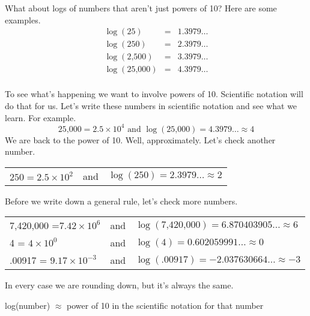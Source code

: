 What about logs of numbers that aren't just powers of 10? Here are some examples.
\begin{eqnarray*}
\log (25) & = & 1.3979\ldots \\
\log (250) & = & 2.3979\ldots \\
\log (\text{2,500}) & = & 3.3979\ldots \\
\log (\text{25,000}) & = & 4.3979\ldots \\
\end{eqnarray*}
\vspace{-.5in} %

To see what's happening we want to involve powers of 10.  Scientific notation will do that for us.  Let's write these numbers in scientific notation and see what we learn.  For example.
$$ \text{25,000} = 2.5 \times 10^4 \text{ and } \log( \text{25,000})=4.3979\ldots \approx 4$$
We are back to the power of 10.  Well, approximately.  Let's check another number.
\begin{center}
\begin{tabular} {lcl}
$250=2.5 \times 10^2$ & and & $\log(\text{250})=2.3979\ldots \approx 2$ \\
\end{tabular}
\end{center}

Before we write down a general rule, let's check more numbers.
\begin{center}
\begin{tabular} {lcl}
7,420,000 =$7.42 \times 10^6$ & and & $\log(\text{7,420,000})=6.870403905\ldots \approx 6$ \\
4 = $4 \times 10^0$ & and & $\log (\text{4})=0.602059991\ldots \approx 0$ \\
.00917 =  $9.17 \times 10^{-3}$ & and & $\log (\text{.00917})=-2.037630664\ldots \approx -3$\\
\end{tabular}
\end{center}
In every case we are rounding down, but it's always the same.

\begin{center}
log(number) $\approx$ power of 10 in the scientific notation for that number
\end{center}



%